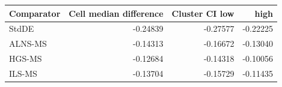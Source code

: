 \begin{tabular}{lrrr}
\toprule
Comparator & Cell median difference & Cluster CI low & high \\
\midrule
StdDE & -0.24839 & -0.27577 & -0.22225 \\
ALNS-MS & -0.14313 & -0.16672 & -0.13040 \\
HGS-MS & -0.12684 & -0.14318 & -0.10056 \\
ILS-MS & -0.13704 & -0.15729 & -0.11435 \\
\bottomrule
\end{tabular}
